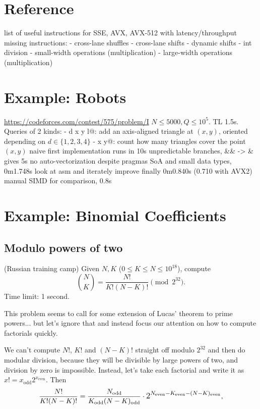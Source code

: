 \documentclass[openany]{book}
\begin{document}
\chapter{Reference}
list of useful instructions for SSE, AVX, AVX-512 with latency/throughput
missing instructions:
- cross-lane shuffles
- cross-lane shifts
- dynamic shifts
- int division
- small-width operations (multiplication)
- large-width operations (multiplication)

\chapter{Example: Robots}
\url{https://codeforces.com/contest/575/problem/I}
$N \le 5000, Q \le 10^5$. TL 1.5s. Queries of 2 kinds:
-  d x y l@: add an axis-aligned triangle at $(x,y)$, oriented depending on $d \in \{1,2,3,4\}$
-  x y@: count how many triangles cover the point $(x, y)$
naive first implementation runs in 10s
unpredictable branches, \&\& -> \& gives 5s
no auto-vectorization despite pragmas
SoA and small data types, 0m1.748s
look at asm and iterately improve
finally 0m0.840s (0.710 with AVX2)
manual SIMD for comparison, 0.8s

\chapter{Example: Binomial Coefficients}
\section{Modulo powers of two}
\begin{framed}
\noindent
(Russian training camp) Given $N, K$ ($0 \le K \le N \le 10^{18}$), compute
\[
\binom N K = \frac{N!}{K!(N-K)!} \pmod {2^{32}}.
\]
Time limit: 1 second.
\end{framed}
This problem seems to call for some extension of Lucas' theorem to prime powers... but let's ignore that and instead focus our attention on how to compute factorials quickly.

\newcommand{\odd}[1]{#1_\text{odd}}
\newcommand{\even}[1]{#1_\text{even}}

We can't compute $N!$, $K!$ and $(N-K)!$ straight off modulo $2^{32}$ and then do modular division, because they will be divisible by large powers of two, and division by zero is impossible.
Instead, let's take each factorial and write it as $x! = \odd{x}2^{\even{x}}$. Then
\[
\frac{N!}{K!(N-K)!} =
\frac{\odd N}{\odd K \odd{(N-K)}} \cdot \mathlarger{2^{\even N - \even K - \even{(N-K)}}},
\]
\end{document}
